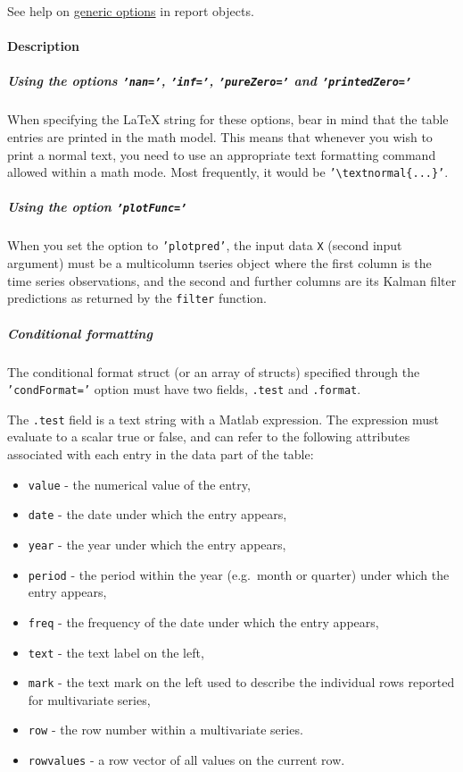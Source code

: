 See help on \href{report/Contents}{generic options} in report objects.

\paragraph{Description}

\subparagraph{Using the options \texttt{'nan='}, \texttt{'inf='},
\texttt{'pureZero='} and
\texttt{'printedZero='}}

When specifying the LaTeX string for these options, bear in mind that
the table entries are printed in the math model. This means that
whenever you wish to print a normal text, you need to use an appropriate
text formatting command allowed within a math mode. Most frequently, it
would be \texttt{'\textbackslash{}textnormal\{...\}'}.

\subparagraph{Using the option
\texttt{'plotFunc='}}

When you set the option to \texttt{'plotpred'}, the input data
\texttt{X} (second input argument) must be a multicolumn tseries object
where the first column is the time series observations, and the second
and further columns are its Kalman filter predictions as returned by the
\texttt{filter} function.

\subparagraph{Conditional formatting}

The conditional format struct (or an array of structs) specified through
the \texttt{'condFormat='} option must have two fields, \texttt{.test}
and \texttt{.format}.

The \texttt{.test} field is a text string with a Matlab expression. The
expression must evaluate to a scalar true or false, and can refer to the
following attributes associated with each entry in the data part of the
table:

\begin{itemize}
\itemsep1pt\parskip0pt
\item
  \texttt{value} - the numerical value of the entry,
\item
  \texttt{date} - the date under which the entry appears,
\item
  \texttt{year} - the year under which the entry appears,
\item
  \texttt{period} - the period within the year (e.g.~month or quarter)
  under which the entry appears,
\item
  \texttt{freq} - the frequency of the date under which the entry
  appears,
\item
  \texttt{text} - the text label on the left,
\item
  \texttt{mark} - the text mark on the left used to describe the
  individual rows reported for multivariate series,
\item
  \texttt{row} - the row number within a multivariate series.
\item
  \texttt{rowvalues} - a row vector of all values on the current row.
\end{itemize}

